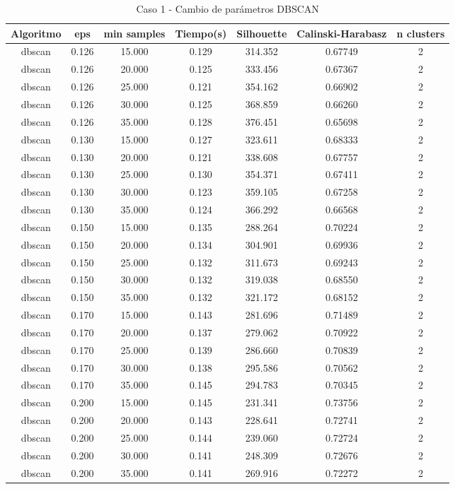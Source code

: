 \begin{table}[H]
\centering
\caption{Caso 1 - Cambio de parámetros DBSCAN}
\label{tab:c1_dbscan}
\begin{tabular}{ccccccc}
\toprule
Algoritmo & eps & min samples & Tiempo(s) & Silhouette & Calinski-Harabasz & n clusters \\
\midrule
dbscan & 0.126 & 15.000 & 0.129 & 314.352 & 0.67749 & 2 \\
dbscan & 0.126 & 20.000 & 0.125 & 333.456 & 0.67367 & 2 \\
dbscan & 0.126 & 25.000 & 0.121 & 354.162 & 0.66902 & 2 \\
dbscan & 0.126 & 30.000 & 0.125 & 368.859 & 0.66260 & 2 \\
dbscan & 0.126 & 35.000 & 0.128 & 376.451 & 0.65698 & 2 \\
dbscan & 0.130 & 15.000 & 0.127 & 323.611 & 0.68333 & 2 \\
dbscan & 0.130 & 20.000 & 0.121 & 338.608 & 0.67757 & 2 \\
dbscan & 0.130 & 25.000 & 0.130 & 354.371 & 0.67411 & 2 \\
dbscan & 0.130 & 30.000 & 0.123 & 359.105 & 0.67258 & 2 \\
dbscan & 0.130 & 35.000 & 0.124 & 366.292 & 0.66568 & 2 \\
dbscan & 0.150 & 15.000 & 0.135 & 288.264 & 0.70224 & 2 \\
dbscan & 0.150 & 20.000 & 0.134 & 304.901 & 0.69936 & 2 \\
dbscan & 0.150 & 25.000 & 0.132 & 311.673 & 0.69243 & 2 \\
dbscan & 0.150 & 30.000 & 0.132 & 319.038 & 0.68550 & 2 \\
dbscan & 0.150 & 35.000 & 0.132 & 321.172 & 0.68152 & 2 \\
dbscan & 0.170 & 15.000 & 0.143 & 281.696 & 0.71489 & 2 \\
dbscan & 0.170 & 20.000 & 0.137 & 279.062 & 0.70922 & 2 \\
dbscan & 0.170 & 25.000 & 0.139 & 286.660 & 0.70839 & 2 \\
dbscan & 0.170 & 30.000 & 0.138 & 295.586 & 0.70562 & 2 \\
dbscan & 0.170 & 35.000 & 0.145 & 294.783 & 0.70345 & 2 \\
dbscan & 0.200 & 15.000 & 0.145 & 231.341 & 0.73756 & 2 \\
dbscan & 0.200 & 20.000 & 0.143 & 228.641 & 0.72741 & 2 \\
dbscan & 0.200 & 25.000 & 0.144 & 239.060 & 0.72724 & 2 \\
dbscan & 0.200 & 30.000 & 0.141 & 248.309 & 0.72676 & 2 \\
dbscan & 0.200 & 35.000 & 0.141 & 269.916 & 0.72272 & 2 \\
\bottomrule
\end{tabular}
\end{table}




